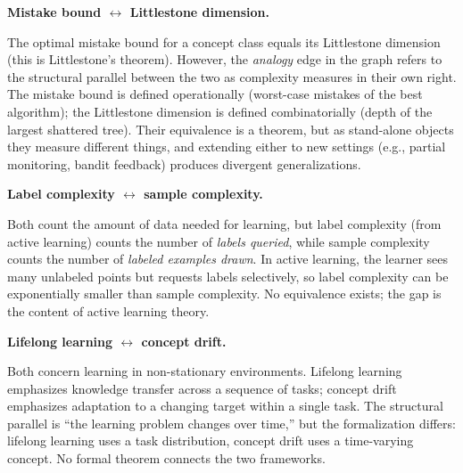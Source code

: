 \begin{obstbox}
\textbf{Mistake bound $\leftrightarrow$ Littlestone dimension.}

\medskip\noindent
The optimal mistake bound for a concept class equals its Littlestone
dimension (this is Littlestone's
theorem).
However, the \emph{analogy} edge in the graph refers to the structural
parallel between the two as complexity measures in their own right. The mistake bound is defined
operationally (worst-case mistakes of the best algorithm); the
Littlestone dimension is defined combinatorially (depth of the largest
shattered tree). Their equivalence is a theorem, but as stand-alone
objects they measure different things, and extending either to new
settings (e.g., partial monitoring, bandit feedback) produces divergent
generalizations.
\end{obstbox}

\begin{obstbox}
\textbf{Label complexity $\leftrightarrow$ sample complexity.}

\medskip\noindent
Both count the amount of data needed for learning, but label complexity
(from active learning) counts the number of \emph{labels queried},
while sample complexity counts the number of \emph{labeled examples
drawn}. In active learning, the learner sees many unlabeled points but
requests labels selectively, so label complexity can be exponentially
smaller than sample complexity. No equivalence exists; the gap is the
content of active learning theory.
\end{obstbox}

\begin{obstbox}
\textbf{Lifelong learning $\leftrightarrow$ concept drift.}

\medskip\noindent
Both concern learning in non-stationary environments. Lifelong learning
emphasizes knowledge transfer across a sequence of tasks; concept drift
emphasizes adaptation to a changing target within a single task. The
structural parallel is ``the learning problem changes over time,'' but
the formalization differs: lifelong learning uses a task distribution,
concept drift uses a time-varying concept. No formal theorem connects
the two frameworks.
\end{obstbox}



